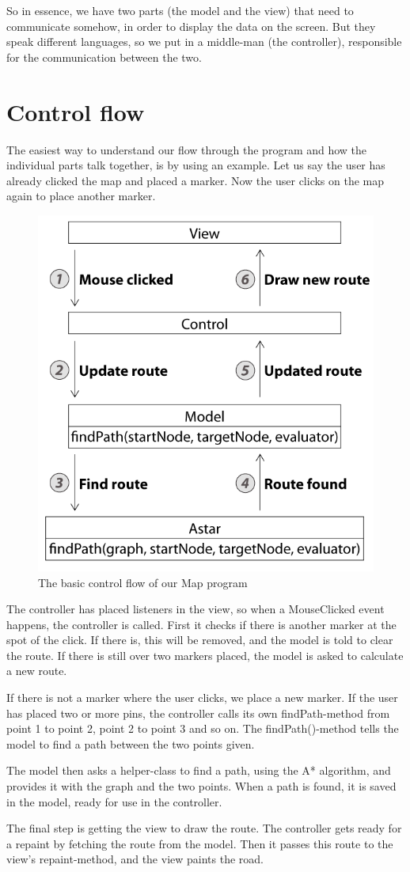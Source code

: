 So in essence, we have two parts (the model and the view) that need to communicate 
somehow, in order to display the data on the screen. But they speak different languages, so 
we put in a middle-man (the controller), responsible for the communication between the two.

\section{Control flow}
\label{UML-CF}
The easiest way to understand our flow through the program and how the individual parts 
talk together, is by using an example. Let us say the user has already clicked the map and 
placed a marker. Now the user clicks on the map again to place another marker.

\begin{figure}[h!]
\centering
\includegraphics[width=0.75\linewidth]{images/SimpleControlFlow}
\caption{The basic control flow of our Map program}
\label{control-flow}
\end{figure}

The controller has placed listeners in the view, so when a MouseClicked event
happens, the controller is called. First it checks if there is another marker
at the spot of the click. If there is, this will be removed, and the model is
told to clear the route. If there is still over two markers placed, the model is
asked to calculate a new route.

If there is not a marker where the user clicks, we place a new marker. If the
user has placed two or more pins, the controller calls its own findPath-method from point 1 to point 2, point 2 to 
point 3 and so on. The findPath()-method tells the model to find a path between the two 
points given.

The model then asks a helper-class to find a path, using the A* algorithm, and provides it 
with the graph and the two points. When a path is found, it is saved in the model, ready 
for use in the controller.

The final step is getting the view to draw the route. The controller gets ready for a repaint
by fetching the route from the model. Then it passes this route to the view's repaint-method, 
and the view paints the road.